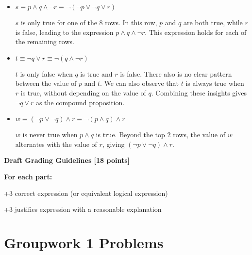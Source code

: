 \documentclass[12pt]{exam}
\newcounter{probnumcount}
\newcommand{\hwnum}{1}
\begin{document}
\begin{solution}

\begin{itemize}
    \item $s \equiv p \land q \land \neg r \equiv \neg(\neg p \lor \neg q \lor r)$
    
    $s$ is only true for one of the 8 rows. In this row, $p$ and $q$ are both true, while $r$ is false, leading to the expression $p \land q \land \neg r$. This expression holds for each of the remaining rows.

    \item $t \equiv \neg q \lor r \equiv \neg(q \land \neg r)$
    
    $t$ is only false when $q$ is true and $r$ is false. There also is no clear pattern between the value of $p$ and $t$. We can also observe that $t$ is always true when $r$ is true, without depending on the value of $q$. Combining these insights gives $\neg q \lor r$ as the compound proposition.

    \item $w \equiv (\neg p \lor \neg q) \land r \equiv \neg(p \land q) \land r$
    
    $w$ is never true when $p \land q$ is true. Beyond the top 2 rows, the value of $w$ alternates with the value of $r$, giving $(\neg p \lor \neg q) \land r$.
\end{itemize}

\smallskip
\textbf{Draft Grading Guidelines [18 points]}

\textbf{For each part:}
\begin{guidelines}
    \item +3 correct expression (or equivalent logical expression)
    \item +3 justifies expression with a reasonable explanation
\end{guidelines}
\end{solution}


\pagebreak
\setcounter{probnumcount}{1}
\section*{Groupwork \hwnum{} Problems}
\end{document}

